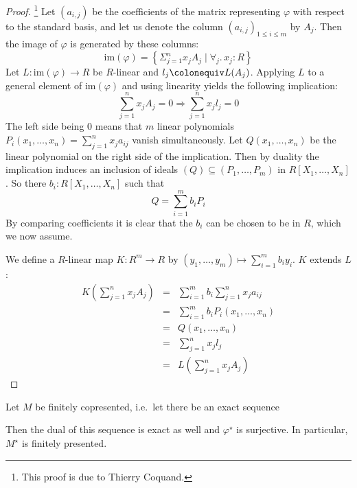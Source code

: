 \begin{proof}\footnote{This proof is due to Thierry Coquand.}
  Let $(a_{i,j})$ be the coefficients of the matrix representing  $\varphi$ with respect to the standard basis, and let us denote the column $(a_{i,j})_{1\leq i\leq m}$ by $A_j$.
  Then the image of $\varphi$ is generated by these columns:
  \[
    \mathrm{im}(\varphi)=\left\{\Sigma_{j=1}^n x_jA_j\mid \forall_j.\, x_j:R\right\}
  \]
  Let $L:\mathrm{im}(\varphi)\to R$ be $R$-linear and $l_j\colonequiv L(A_j)$.
  Applying $L$ to a general element of $\mathrm{im}(\varphi)$ and using linearity yields the following implication:
  \[
    \sum_{j=1}^n x_jA_j = 0 \Rightarrow \sum_{j=1}^n x_jl_j = 0
  \]
  The left side being 0 means that $m$ linear polynomials $P_i(x_1,\dots,x_n)=\sum_{j=1}^n x_ja_{ij} $ vanish simultaneously.
  Let $Q(x_1,\dots,x_n)$ be the linear polynomial on the right side of the implication.
  Then by duality  the implication induces an inclusion of ideals $(Q)\subseteq (P_1,\dots,P_m)$ in $R[X_1,\dots,X_n]$.
  So there $b_i:R[X_1,\dots,X_n]$ such that
  \[
     Q = \sum_{i=1}^m b_iP_i
   \]
   By comparing coefficients it is clear that the $b_i$ can be chosen to be in $R$, which we now assume.
   
   We define a $R$-linear map $K:R^m\to R$ by $(y_1,\dots,y_m)\mapsto\sum_{i=1}^m b_iy_i$.
   $K$ extends $L$:
   \begin{eqnarray*}
     K\left(\sum_{j=1}^n x_jA_j\right) &=&\sum_{i=1}^m b_i\sum_{j=1}^n x_ja_{ij} \\
     &=& \sum_{i=1}^m b_iP_i(x_1,\dots,x_n) \\
     &=& Q(x_1,\dots,x_n) \\
     &=& \sum_{j=1}^n x_jl_j \\
     &=& L\left(\sum_{j=1}^n x_jA_j\right)
   \end{eqnarray*}
\end{proof}

\begin{lemma}
  \label{dual-of-fcop-fp}
  Let $M$ be finitely copresented, i.e.\ let there be an exact sequence
  \begin{center}
  \end{center}
  Then the dual of this sequence is exact as well and $\varphi^\star$ is surjective.
  In particular, $M^\star$ is finitely presented.
\end{lemma}

